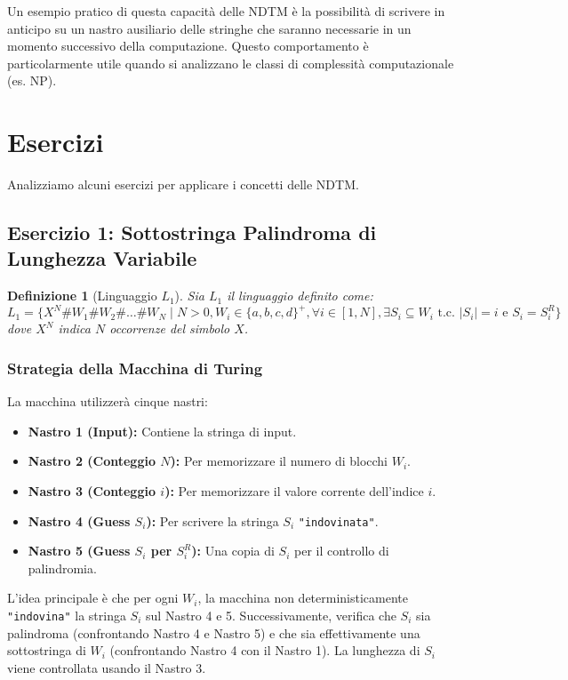 \documentclass[a4paper, 11pt]{book} %
\newtheorem{definition}[theorem]{Definizione}
\theoremstyle{definition}
\begin{document}
Un esempio pratico di questa capacità delle NDTM è la possibilità di scrivere in anticipo su un nastro ausiliario delle stringhe che saranno necessarie in un momento successivo della computazione. Questo comportamento è particolarmente utile quando si analizzano le classi di complessità computazionale (es. NP).

\section{Esercizi}

Analizziamo alcuni esercizi per applicare i concetti delle NDTM.

\subsection{Esercizio 1: Sottostringa Palindroma di Lunghezza Variabile}

\begin{definition}[Linguaggio $L_1$]
Sia $L_1$ il linguaggio definito come:
$L_1 = \{ X^N \# W_1 \# W_2 \# \dots \# W_N \mid N > 0, W_i \in \{a,b,c,d\}^+, \forall i \in [1, N], \exists S_i \subseteq W_i \text{ t.c. } |S_i| = i \text{ e } S_i = S_i^R \}$
dove $X^N$ indica $N$ occorrenze del simbolo $X$.
\end{definition}

\subsubsection{Strategia della Macchina di Turing}
La macchina utilizzerà cinque nastri:
\begin{itemize}
    \item \textbf{Nastro 1 (Input):} Contiene la stringa di input.
    \item \textbf{Nastro 2 (Conteggio $N$):} Per memorizzare il numero di blocchi $W_i$.
    \item \textbf{Nastro 3 (Conteggio $i$):} Per memorizzare il valore corrente dell'indice $i$.
    \item \textbf{Nastro 4 (Guess $S_i$):} Per scrivere la stringa $S_i$ \texttt{"indovinata"}.
    \item \textbf{Nastro 5 (Guess $S_i$ per $S_i^R$):} Una copia di $S_i$ per il controllo di palindromia.
\end{itemize}

L'idea principale è che per ogni $W_i$, la macchina non deterministicamente \texttt{"indovina"} la stringa $S_i$ sul Nastro 4 e 5. Successivamente, verifica che $S_i$ sia palindroma (confrontando Nastro 4 e Nastro 5) e che sia effettivamente una sottostringa di $W_i$ (confrontando Nastro 4 con il Nastro 1). La lunghezza di $S_i$ viene controllata usando il Nastro 3.
\end{document}
